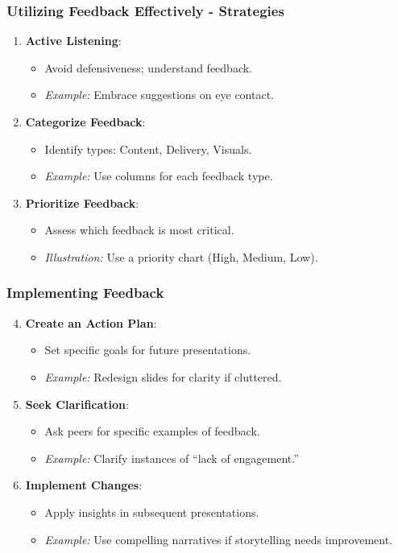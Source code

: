 \documentclass[aspectratio=169]{beamer}
\begin{document}
\begin{frame}[fragile]
    \frametitle{Utilizing Feedback Effectively - Strategies}
    \begin{enumerate}
        \item \textbf{Active Listening}:
            \begin{itemize}
                \item Avoid defensiveness; understand feedback.
                \item \textit{Example:} Embrace suggestions on eye contact.
            \end{itemize}
        \item \textbf{Categorize Feedback}:
            \begin{itemize}
                \item Identify types: Content, Delivery, Visuals.
                \item \textit{Example:} Use columns for each feedback type.
            \end{itemize}
        \item \textbf{Prioritize Feedback}:
            \begin{itemize}
                \item Assess which feedback is most critical.
                \item \textit{Illustration:} Use a priority chart (High, Medium, Low).
            \end{itemize}
    \end{enumerate}
\end{frame}

\begin{frame}[fragile]
    \frametitle{Implementing Feedback}
    \begin{enumerate}
        \setcounter{enumi}{3}
        \item \textbf{Create an Action Plan}:
            \begin{itemize}
                \item Set specific goals for future presentations.
                \item \textit{Example:} Redesign slides for clarity if cluttered.
            \end{itemize}
        \item \textbf{Seek Clarification}:
            \begin{itemize}
                \item Ask peers for specific examples of feedback.
                \item \textit{Example:} Clarify instances of “lack of engagement.”
            \end{itemize}
        \item \textbf{Implement Changes}:
            \begin{itemize}
                \item Apply insights in subsequent presentations.
                \item \textit{Example:} Use compelling narratives if storytelling needs improvement.
            \end{itemize}
    \end{enumerate}
\end{frame}
\end{document}
